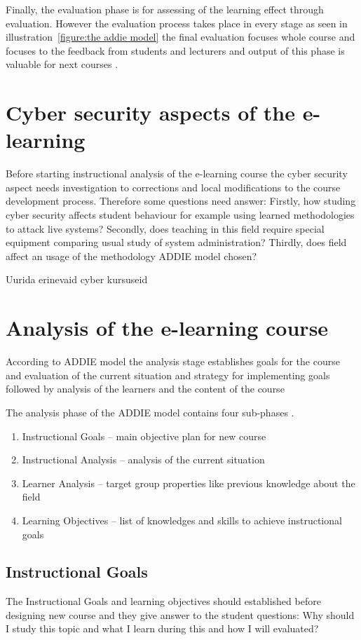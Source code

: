 Finally, the evaluation phase is for assessing of the learning effect through evaluation. However the evaluation process takes place in every stage as seen in illustration~\ref{figure:the addie model} the final evaluation focuses whole course and focuses to the feedback from students and lecturers and output of this phase is valuable for next courses \citep{OppeArenduskeskus2010, website:addie}.



\section{Cyber security aspects of the e-learning}
Before starting instructional analysis of the e-learning course the cyber security aspect needs investigation to corrections and local modifications to the course development process. Therefore some questions need answer: Firstly, how studing cyber security affects student behaviour for example using learned methodologies to attack live systems? Secondly, does teaching in this field require special equipment comparing usual study of system administration? Thirdly, does field affect an usage of the methodology \gls{ADDIE} model chosen?

{\color{red} Uurida erinevaid cyber kursuseid } 


\section{Analysis of the e-learning course}
According to \gls{ADDIE} model the analysis stage establishes goals for the course and evaluation of the current situation and strategy for implementing goals followed by analysis of the learners and the content of the course \citep{website:addie}

The analysis phase of the \gls{ADDIE} model contains four sub-phases \citep{website:addie}.
\begin{enumerate}
\item Instructional Goals -- main objective plan for new course
\item Instructional Analysis -- analysis of the current situation
\item Learner Analysis -- target group properties like previous knowledge about the field
\item Learning Objectives -- list of knowledges and skills to achieve instructional goals
\end{enumerate}


\subsection{Instructional Goals}
The Instructional Goals and learning objectives should established before designing new course and they give answer to the student questions: Why should I study this topic and what I learn during this and how I will evaluated? \citep{website:addie}


